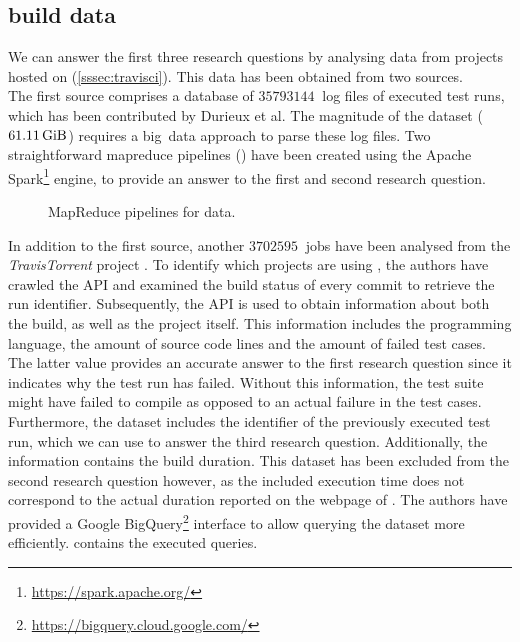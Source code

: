 
\subsection{\travisci{} build data}
We can answer the first three research questions by analysing data from projects hosted on \travisci{} (\cref{sssec:travisci}). This data has been obtained from two sources.\\

\noindent The first source comprises a database \cite{travisanalysis} of $\SI{35793144}{}$ log files of executed test runs, which has been contributed by Durieux et al. The magnitude of the dataset ($\SI{61.11}{\gibi\byte}$) requires a \mbox{big data} approach to parse these log files. Two straightforward \Gls{mapreduce} pipelines () have been created using the Apache Spark\footnote{\url{https://spark.apache.org/}} engine, to provide an answer to the first and second research question.

\begin{figure}[htbp!]
	\centering
	\newline
	\caption{MapReduce pipelines for \travisci{} data.}
	\label{fig:eval-mapreduce}
\end{figure}

\noindent In addition to the first source, another $\SI{3702595}{}$ jobs have been analysed from the \mbox{\emph{TravisTorrent}} project \cite{msr17challenge}. To identify which projects are using \travisci{}, the authors have crawled the \github{} API and examined the build status of every commit to retrieve the run identifier.
Subsequently, the \travisci{} API is used to obtain information about both the build, as well as the project itself. This information includes the programming language, the amount of source code lines and the amount of failed test cases. The latter value provides an accurate answer to the first research question since it indicates why the test run has failed. Without this information, the test suite might have failed to compile as opposed to an actual failure in the test cases. Furthermore, the dataset includes the identifier of the previously executed test run, which we can use to answer the third research question. Additionally, the information contains the build duration. This dataset has been excluded from the second research question however, as the included execution time does not correspond to the actual duration reported on the webpage of \travisci{}. The authors have provided a Google BigQuery\footnote{\url{https://bigquery.cloud.google.com/}} interface to allow querying the dataset more efficiently.  contains the executed queries.
